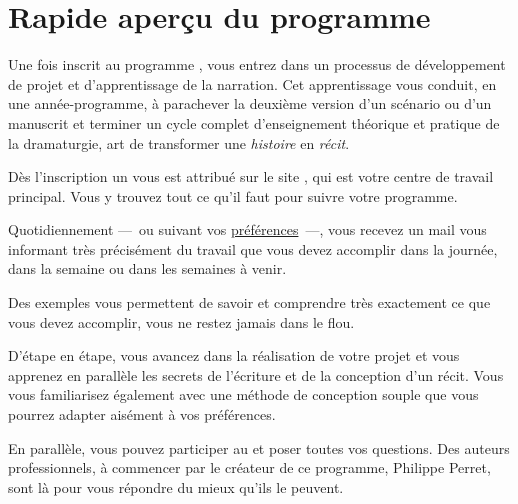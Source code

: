 % 
% 
% 
% 
% 
% 
% 
% 

\section{Rapide aperçu du programme}\hypertarget{overview}{}\label{overview}

Une fois inscrit au programme \unan{}, vous entrez dans un processus de développement de projet et d'apprentissage de la narration. Cet apprentissage vous conduit, en une année-programme, à parachever la deuxième version d'un scénario ou d'un manuscrit et terminer un cycle complet d'enseignement théorique et pratique de la dramaturgie, art de transformer une \emph{histoire} en \emph{récit}.

Dès l'inscription un \bureau{} vous est attribué sur le site \boa{}, qui est votre centre de travail principal. Vous y trouvez tout ce qu'il faut pour suivre votre programme.

Quotidiennement —~{}ou suivant vos \hyperlink{preferences-auteur}{préférences}~{}—, vous recevez un mail vous informant très précisément du travail que vous devez accomplir dans la journée, dans la semaine ou dans les semaines à venir.

Des exemples vous permettent de savoir et comprendre très exactement ce que vous devez accomplir, vous ne restez jamais dans le flou.

D'étape en étape, vous avancez dans la réalisation de votre projet et vous apprenez en parallèle les secrets de l'écriture et de la conception d'un récit. Vous vous familiarisez également avec une méthode de conception souple que vous pourrez adapter aisément à vos préférences.

En parallèle, vous pouvez participer au \forum{} et poser toutes vos questions. Des auteurs professionnels, à commencer par le créateur de ce programme, Philippe Perret, sont là pour vous répondre du mieux qu'ils le peuvent.

